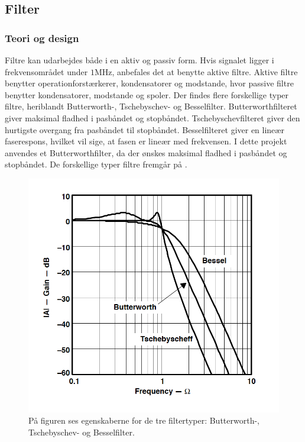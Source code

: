 \subsection{Filter}\label{Filter_afsnit}
\subsubsection{Teori og design}
Filtre kan udarbejdes både i en aktiv og passiv form. Hvis signalet ligger i frekvensområdet under $1$MHz, anbefales det at benytte aktive filtre. Aktive filtre benytter operationforstærkerer, kondensatorer og modstande, hvor passive filtre benytter kondensatorer, modstande og spoler. \cite{Carter2013} Der findes flere forskellige typer filtre, heriblandt Butterworth-, Tschebyschev- og Besselfilter. Butterworthfilteret giver maksimal fladhed i pasbåndet og stopbåndet. Tschebyschevfilteret giver den hurtigste overgang fra pasbåndet til stopbåndet. Besselfilteret giver en lineær faserespons, hvilket vil sige, at fasen er lineær med frekvensen. \cite{Carter2013} I dette projekt anvendes et Butterworthfilter, da der ønskes maksimal fladhed i pasbåndet og stopbåndet. De forskellige typer filtre fremgår på .
\begin{figure}[H]
	\centering
	\includegraphics[scale=0.7]{figures/cProblemloesning/type_filtre.PNG}
	\caption{På figuren ses egenskaberne for de tre filtertyper: Butterworth-, Tschebyschev- og Besselfilter. \cite{Carter2013}}
	\label{fig:type_filtre}
\end{figure}
